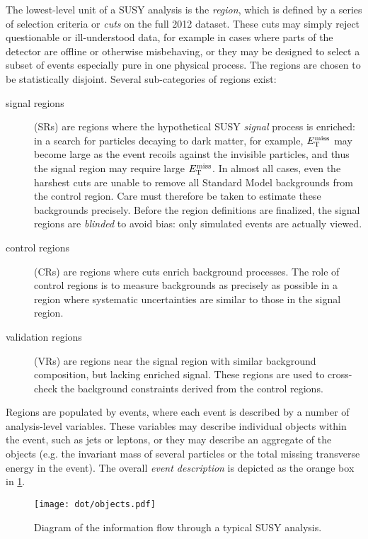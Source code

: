 The lowest-level unit of a SUSY analysis is the \emph{region}, which is defined by a series of selection criteria or \emph{cuts} on the full 2012 dataset. These cuts may simply reject questionable or ill-understood data, for example in cases where parts of the detector are offline or otherwise misbehaving, or they may be designed to select a subset of events especially pure in one physical process. The regions are chosen to be statistically disjoint. Several sub-categories of regions exist:
\begin{description}
\item[signal regions] (SRs) are regions where the hypothetical SUSY \emph{signal} process is enriched: in a search for particles decaying to dark matter, for example, $E_{\rm T}^{\rm miss}$ may become large as the event recoils against the invisible particles, and thus the signal region may require large $E_{\rm T}^{\rm miss}$. In almost all cases, even the harshest cuts are unable to remove all Standard Model backgrounds from the control region. Care must therefore be taken to estimate these backgrounds precisely. Before the region definitions are finalized, the signal regions are \emph{blinded} to avoid bias: only simulated events are actually viewed.
\item[control regions] (CRs) are regions where cuts enrich background processes. The role of control regions is to measure backgrounds as precisely as possible in a region where systematic uncertainties are similar to those in the signal region.
\item[validation regions] (VRs) are regions near the signal region with similar background composition, but lacking enriched signal. These regions are used to cross-check the background constraints derived from the control regions.
\end{description}
Regions are populated by events, where each event is described by a number of analysis-level variables. These variables may describe individual objects within the event, such as jets or leptons, or they may describe an aggregate of the objects (e.g. the invariant mass of several particles or the total missing transverse energy in the event). The overall \emph{event description} is depicted as the orange box in \cref{fig:analysis-flow}.

\begin{figure}[h]
  \begin{center}
    \texttt{[image: dot/objects.pdf]}
    \caption[Analysis Strategy]{Diagram of the information flow through a typical SUSY analysis.}
    \label{fig:analysis-flow}
  \end{center}
\end{figure}

